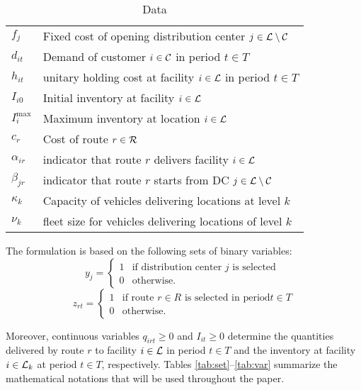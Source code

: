 \documentclass[a4paper,10pt]{article}
\begin{document}
\begin{linenumbers}
 \begin{table}[htbp]
	\centering
	\begin{tabular}{ll}
		\toprule
		$f_j$ & Fixed cost of opening distribution center $j\in\mathcal{L} \setminus \mathcal{C}$\\ 
		$d_{it}$ & Demand of customer $i\in\mathcal{C}$ in period $t \in T$\\
		$h_{it}$ & unitary holding cost at facility $i\in\mathcal{L}$ in period $t \in T$\\
		$I_{i0}$ & Initial inventory at facility $i\in \mathcal{L}$\\
		$I_i^{\max}$ & Maximum inventory at location $i\in\mathcal{L}$\\
		$c_r$ & Cost of route $r\in \mathcal{R}$\\
		$\alpha_{ir}$ & indicator that route $r$ delivers facility $i \in \mathcal{L}$\\
		$\beta_{jr}$ & indicator that route $r$ starts from DC $j \in \mathcal{L} \setminus \mathcal{C}$\\
		$\kappa_k$ & Capacity of vehicles delivering locations at level $k$\\ 
		$\nu_k$ & fleet size for vehicles delivering locations of level $k$\\ 
		
		\bottomrule
	\end{tabular}
	\caption{Data}
	\label{tab:data}
\end{table}       

The formulation is based on the following sets of binary variables: 
$$	y_j  = \left\{
\begin{array}{ll}
1 & \mbox{if distribution center } j \mbox{ is selected }  \\
0 & \mbox{otherwise.}
\end{array}
\right.
$$
$$	z_{rt}  = \left\{
\begin{array}{ll}
1 & \mbox{if route } r \in R \mbox{ is selected in period} t \in T \\
0 & \mbox{otherwise.}
\end{array}
\right.
$$

Moreover, continuous variables $q_{irt} \geq 0$ and $I_{it} \geq 0$  determine the quantities delivered by route $r$ to facility $i \in \mathcal{L}$ in period $t\in T$
and the inventory at facility $i \in \mathcal{L}_{k}$ at period $t \in T$, respectively. 
Tables \ref{tab:set}--\ref{tab:var} summarize the mathematical notations that will be used throughout the paper.



\end{linenumbers}
\end{document}
